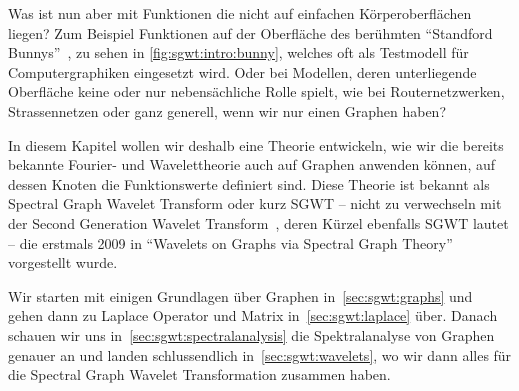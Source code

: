 Was ist nun aber mit Funktionen die nicht auf einfachen K\"orperoberfl\"achen 
liegen? Zum Beispiel Funktionen auf der Oberfl\"ache des ber\"uhmten 
``Standford Bunnys''~\cite{noauthor_stanford_nodate}, zu sehen in 
\cref{fig:sgwt:intro:bunny}, welches oft als Testmodell f\"ur Computergraphiken 
eingesetzt wird. Oder bei Modellen, deren unterliegende Oberfl\"ache keine oder 
nur nebens\"achliche Rolle spielt, wie bei Routernetzwerken, Strassennetzen 
oder ganz generell, wenn wir nur einen Graphen haben?

In diesem Kapitel wollen wir deshalb eine Theorie entwickeln, wie 
wir die bereits bekannte Fourier- und Wavelettheorie auch auf Graphen anwenden 
k\"onnen, auf dessen Knoten die Funktionswerte definiert sind. Diese Theorie 
ist bekannt als Spectral Graph Wavelet Transform oder kurz SGWT -- nicht zu 
verwechseln mit der Second Generation Wavelet 
Transform~\cite{noauthor_second-generation_2018}, deren K\"urzel ebenfalls SGWT 
lautet -- die erstmals 2009 in ``Wavelets on Graphs via Spectral Graph 
Theory''~\cite{hammond_wavelets_2009} vorgestellt wurde.

Wir starten mit einigen Grundlagen \"uber Graphen in~\cref{sec:sgwt:graphs} und 
gehen dann zu Laplace Operator und Matrix in~\cref{sec:sgwt:laplace} \"uber. 
Danach schauen wir uns in~\cref{sec:sgwt:spectralanalysis} die Spektralanalyse 
von Graphen genauer an und landen schlussendlich in~\cref{sec:sgwt:wavelets}, 
wo wir dann alles f\"ur die Spectral Graph Wavelet Transformation zusammen 
haben.
